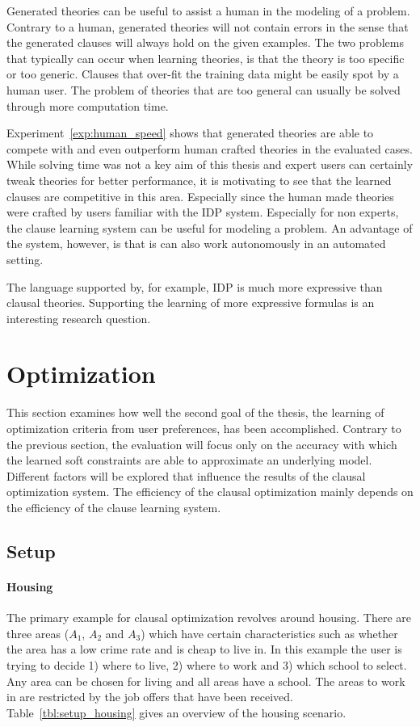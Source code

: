 Generated theories can be useful to assist a human in the modeling of a problem.
Contrary to a human, generated theories will not contain errors in the sense that the generated clauses will always hold on the given examples.
The two problems that typically can occur when learning theories, is that the theory is too specific or too generic.
Clauses that over-fit the training data might be easily spot by a human user.
The problem of theories that are too general can usually be solved through more computation time. 

Experiment~\ref{exp:human_speed} shows that generated theories are able to compete with and even outperform human crafted theories in the evaluated cases.
While solving time was not a key aim of this thesis and expert users can certainly tweak theories for better performance, it is motivating to see that the learned clauses are competitive in this area.
Especially since the human made theories were crafted by users familiar with the IDP system.
Especially for non experts, the clause learning system can be useful for modeling a problem.
An advantage of the system, however, is that is can also work autonomously in an automated setting.

The language supported by, for example, IDP is much more expressive than clausal theories.
Supporting the learning of more expressive formulas is an interesting research question.

\section{Optimization}
This section examines how well the second goal of the thesis, the learning of optimization criteria from user preferences, has been accomplished.
Contrary to the previous section, the evaluation will focus only on the accuracy with which the learned soft constraints are able to approximate an underlying model.
Different factors will be explored that influence the results of the clausal optimization system.
The efficiency of the clausal optimization mainly depends on the efficiency of the clause learning system.

\subsection{Setup}

\paragraph{Housing}
The primary example for clausal optimization revolves around housing.
There are three areas ($A_1$, $A_2$ and $A_3$) which have certain characteristics such as whether the area has a low crime rate and is cheap to live in.
In this example the user is trying to decide 1) where to live, 2) where to work and 3) which school to select.
Any area can be chosen for living and all areas have a school.
The areas to work in are restricted by the job offers that have been received.
Table~\ref{tbl:setup_housing} gives an overview of the housing scenario.

